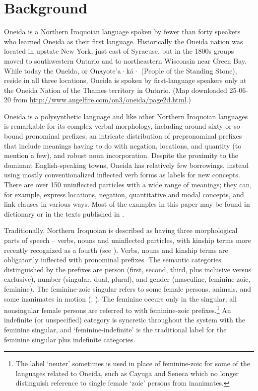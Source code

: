 \documentclass[output=paper]{langscibook}
\begin{document}
\section{Background}\label{sec:oneida:2}

Oneida is a Northern Iroquoian language spoken by fewer than forty speakers who learned Oneida as their first language. Historically the Oneida nation was located in upstate New York, just east of Syracuse, but in the 1800s groups moved to southwestern Ontario and to northeastern Wisconsin near Green Bay. While today the Oneida, or Onʌyote’a·ká· (People of the Standing Stone), reside in all three locations, Oneida is spoken by first-language speakers only at the Oneida Nation of the Thames territory in Ontario. (Map downloaded 25-06-20 from \url{http://www.angelfire.com/on3/oneida/page2d.html}.)


Oneida is a polysynthetic language and like other Northern Iroquoian languages is remark\-able for its complex verbal morphology, including around sixty or so bound pronominal prefixes, an intricate distribution of prepronominal prefixes that include meanings having to do with negation, locations, and quantity (to mention a few), and robust noun incorporation. Despite the proximity to the dominant English-speaking towns, Oneida has relatively few borrowings, instead using mostly conventionalized inflected verb forms as labels for new concepts. There are over 150 uninflected particles with a wide range of meanings; they can, for example, express locations, negation, quantitative and modal concepts, and link clauses in various ways. Most of the examples in this paper may be found in \citep{MichelsonDoxtator2002} dictionary or in the texts published in \citet{MichelsonKennedyDoxtator2016}.

Traditionally, Northern Iroquoian is described as having three morphological parts of speech – verbs, nouns and uninflected particles, with kinship terms more recently recog\-nized as a fourth (see \citealt{KoenigMichelson2010}). Verbs, nouns and kinship terms are obligatorily inflected with pronominal prefixes. The semantic categories distinguished by the prefixes are person (first, second, third, plus inclusive versus exclusive), number (singular, dual, plural), and gender (masculine, feminine-zoic, feminine). The feminine-zoic singular refers to some female persons, animals, and some inanimates in motion (\citealt{Abbott1984}, \citealt{Michelson2015}). The femi\-nine occurs only in the singular; all nonsingular female persons are referred to with feminine-zoic prefixes.\footnote{The label ‘neuter’ sometimes is used in place of feminine-zoic for some of the languages related to Oneida, such as Cayuga and Seneca which no longer distinguish reference to single female ‘zoic’ persons from inanimates.} An indefinite (or unspecified) category is syncretic throughout the system with the feminine singular, and ‘feminine-indefinite’ is the traditional label for the feminine singular plus indefinite categories.
\end{document}
